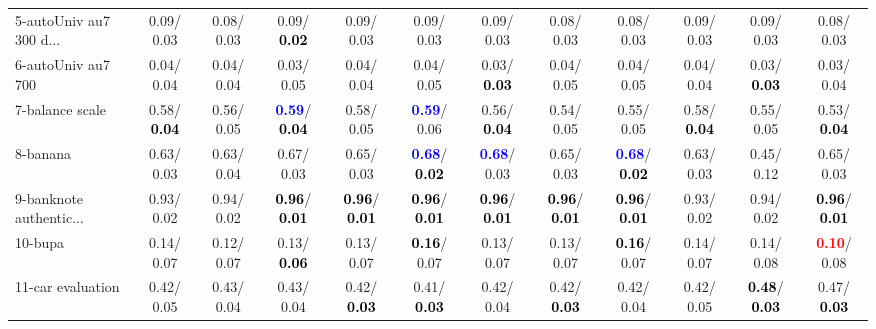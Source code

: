 \begin{table}[h]
\begin{center}
{\begin{tabular}{lc|c|c|c|c|c|c|c|c|c|c}
5-autoUniv au7 300 d... &   0.09/  0.03 &   0.08/  0.03 &   0.09/\textcolor{black}{\textbf{  0.02}} &   0.09/  0.03 &   0.09/  0.03 &   0.09/  0.03 &   0.08/  0.03 &   0.08/  0.03 &   0.09/  0.03 &   0.09/  0.03 &   0.08/  0.03 \\
6-autoUniv au7 700 &   0.04/  0.04 &   0.04/  0.04 &   0.03/  0.05 &   0.04/  0.04 &   0.04/  0.05 &   0.03/\textcolor{black}{\textbf{  0.03}} &   0.04/  0.05 &   0.04/  0.05 &   0.04/  0.04 &   0.03/\textcolor{black}{\textbf{  0.03}} &   0.03/  0.04 \\
7-balance scale &   0.58/\textcolor{black}{\textbf{  0.04}} &   0.56/  0.05 & \textcolor{blue}{\textbf{  0.59}}/\textcolor{black}{\textbf{  0.04}} &   0.58/  0.05 & \textcolor{blue}{\textbf{  0.59}}/  0.06 &   0.56/\textcolor{black}{\textbf{  0.04}} &   0.54/  0.05 &   0.55/  0.05 &   0.58/\textcolor{black}{\textbf{  0.04}} &   0.55/  0.05 &   0.53/\textcolor{black}{\textbf{  0.04}} \\ \hline
8-banana &   0.63/  0.03 &   0.63/  0.04 &   0.67/  0.03 &   0.65/  0.03 & \textcolor{blue}{\textbf{  0.68}}/\textcolor{black}{\textbf{  0.02}} & \textcolor{blue}{\textbf{  0.68}}/  0.03 &   0.65/  0.03 & \textcolor{blue}{\textbf{  0.68}}/\textcolor{black}{\textbf{  0.02}} &   0.63/  0.03 &   0.45/  0.12 &   0.65/  0.03 \\
9-banknote authentic... &   0.93/  0.02 &   0.94/  0.02 & \textcolor{black}{\textbf{  0.96}}/\textcolor{black}{\textbf{  0.01}} & \textcolor{black}{\textbf{  0.96}}/\textcolor{black}{\textbf{  0.01}} & \textcolor{black}{\textbf{  0.96}}/\textcolor{black}{\textbf{  0.01}} & \textcolor{black}{\textbf{  0.96}}/\textcolor{black}{\textbf{  0.01}} & \textcolor{black}{\textbf{  0.96}}/\textcolor{black}{\textbf{  0.01}} & \textcolor{black}{\textbf{  0.96}}/\textcolor{black}{\textbf{  0.01}} &   0.93/  0.02 &   0.94/  0.02 & \textcolor{black}{\textbf{  0.96}}/\textcolor{black}{\textbf{  0.01}} \\
10-bupa &   0.14/  0.07 &   0.12/  0.07 &   0.13/\textcolor{black}{\textbf{  0.06}} &   0.13/  0.07 & \textcolor{black}{\textbf{  0.16}}/  0.07 &   0.13/  0.07 &   0.13/  0.07 & \textcolor{black}{\textbf{  0.16}}/  0.07 &   0.14/  0.07 &   0.14/  0.08 & \textcolor{red}{\textbf{  0.10}}/  0.08 \\
11-car evaluation &   0.42/  0.05 &   0.43/  0.04 &   0.43/  0.04 &   0.42/\textcolor{black}{\textbf{  0.03}} &   0.41/\textcolor{black}{\textbf{  0.03}} &   0.42/  0.04 &   0.42/\textcolor{black}{\textbf{  0.03}} &   0.42/  0.04 &   0.42/  0.05 & \textcolor{black}{\textbf{  0.48}}/\textcolor{black}{\textbf{  0.03}} &   0.47/\textcolor{black}{\textbf{  0.03}} \\

\end{tabular}}
\end{center}
\end{table}
